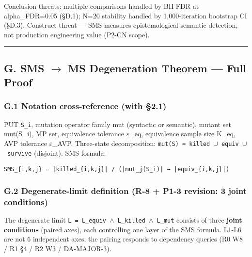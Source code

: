 \documentclass[review,12pt,authoryear]{elsarticle}
\begin{document}
Conclusion threats: multiple comparisons handled by BH-FDR at
alpha\_FDR=0.05 (§D.1); N=20 stability handled by 1,000-iteration
bootstrap CI (§D.3). Construct threat --- SMS measures epistemological
semantic detection, not production engineering value (P2-CN scope).

\begin{center}\rule{0.5\linewidth}{0.5pt}\end{center}

\subsection{G. SMS $\to$ MS Degeneration Theorem --- Full
Proof}\label{g.-sms-ms-degeneration-theorem-full-proof}

\subsubsection{G.1 Notation cross-reference (with
§2.1)}\label{g.1-notation-cross-reference-with-2.1}

PUT \texttt{S\_i}, mutation operator family mut (syntactic or semantic),
mutant set mut(S\_i), MP set, equivalence tolerance $\varepsilon$\_eq, equivalence
sample size K\_eq, AVP tolerance $\varepsilon$\_AVP. Three-state decomposition:
\texttt{mut(S)\ =\ killed\ $\cup$\ equiv\ $\cup$\ survive} (disjoint). SMS
formula:

\begin{verbatim}
SMS_{i,k,j} = |killed_{i,k,j}| / (|mut_j(S_i)| − |equiv_{i,k,j}|)
\end{verbatim}

\subsubsection{G.2 Degenerate-limit definition (R-8 + P1-3 revision: 3
joint
conditions)}\label{g.2-degenerate-limit-definition-r-8-p1-3-revision-3-joint-conditions}

The degenerate limit \texttt{L\ =\ L\_equiv\ $\wedge$\ L\_killed\ $\wedge$\ L\_mut}
consists of three \textbf{joint conditions} (paired axes), each
controlling one layer of the SMS formula. L1-L6 are not 6 independent
axes; the pairing responds to dependency queries (R0 W8 / R1 §4 / R2 W3
/ DA-MAJOR-3).
\end{document}
